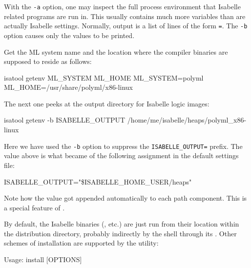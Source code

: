 \begin{isabellebody}
\begin{isamarkuptext}
  With the \verb|-a| option, one may inspect the full process
  environment that Isabelle related programs are run in. This usually
  contains much more variables than are actually Isabelle settings.
  Normally, output is a list of lines of the form \verb|=|. The \verb|-b| option
  causes only the values to be printed.%
\end{isamarkuptext}%
\isamarkuptrue%
%
\isamarkuptrue%
%
\begin{isamarkuptext}%
Get the ML system name and the location where the compiler binaries
  are supposed to reside as follows:
\begin{ttbox}
isatool getenv ML_SYSTEM ML_HOME
{\out ML_SYSTEM=polyml}
{\out ML_HOME=/usr/share/polyml/x86-linux}
\end{ttbox}

  The next one peeks at the output directory for Isabelle logic
  images:
\begin{ttbox}
isatool getenv -b ISABELLE_OUTPUT
{\out /home/me/isabelle/heaps/polyml_x86-linux}
\end{ttbox}
  Here we have used the \verb|-b| option to suppress the
  \verb|ISABELLE_OUTPUT=| prefix.  The value above is what
  became of the following assignment in the default settings file:
\begin{ttbox}
ISABELLE_OUTPUT="\$ISABELLE_HOME_USER/heaps"
\end{ttbox}

  Note how the \hyperlink{setting.ML-IDENTIFIER}{\mbox{}} value got appended
  automatically to each path component. This is a special feature of
  \hyperlink{setting.ISABELLE-OUTPUT}{\mbox{}}.%
\end{isamarkuptext}%
\isamarkuptrue%
%
\isamarkuptrue%
%
\begin{isamarkuptext}%
By default, the Isabelle binaries (\hyperlink{executable.isabelle-process}{\mbox{}},
  \hyperlink{executable.isatool}{\mbox{}} etc.) are just run from their location within
  the distribution directory, probably indirectly by the shell through
  its \hyperlink{setting.PATH}{\mbox{}}.  Other schemes of installation are supported by
  the \hypertarget{tool.install}{\hyperlink{tool.install}{\mbox{}}} utility:
\begin{ttbox}
Usage: install [OPTIONS]


\end{ttbox}
\end{isamarkuptext}
\end{isabellebody}

